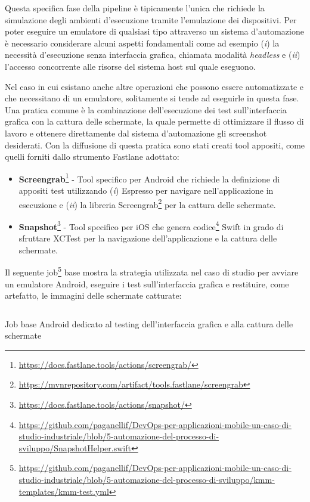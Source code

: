 Questa specifica fase della pipeline è tipicamente l'unica che richiede la simulazione degli ambienti d'esecuzione tramite l'emulazione dei dispositivi. 
Per poter eseguire un emulatore di qualsiasi tipo attraverso un sistema d'automazione è necessario considerare alcuni aspetti fondamentali come ad esempio (\textit{i}) la necessità d'esecuzione senza interfaccia grafica, 
chiamata modalità \textit{headless} e (\textit{ii}) l'accesso concorrente alle risorse del sistema host sul quale eseguono. 

Nel caso in cui esistano anche altre operazioni che possono essere automatizzate e che necessitano di un emulatore,
solitamente si tende ad eseguirle in questa fase. 
Una pratica comune è la combinazione dell'esecuzione dei test sull'interfaccia grafica con la cattura delle schermate, 
la quale permette di ottimizzare il flusso di lavoro e ottenere direttamente dal sistema d'automazione gli screenshot desiderati. 
Con la diffusione di questa pratica sono stati creati tool appositi, come quelli forniti dallo strumento Fastlane adottato:

\begin{itemize}
    \item \textbf{Screengrab}\footnote{\href{https://docs.fastlane.tools/actions/screengrab/}{https://docs.fastlane.tools/actions/screengrab/}} - Tool specifico per Android che richiede la definizione di appositi test utilizzando (\textit{i}) Espresso per navigare nell'applicazione in esecuzione e (\textit{ii}) la libreria Screengrab\footnote{\href{https://mvnrepository.com/artifact/tools.fastlane/screengrab}{https://mvnrepository.com/artifact/tools.fastlane/screengrab}} per la cattura delle schermate.
    
    \item \textbf{Snapshot}\footnote{\href{https://docs.fastlane.tools/actions/snapshot/}{https://docs.fastlane.tools/actions/snapshot/}} - Tool specifico per iOS che genera codice\footnote{\href{https://github.com/paganellif/DevOps-per-applicazioni-mobile-un-caso-di-studio-industriale/blob/5-automazione-del-processo-di-sviluppo/SnapshotHelper.swift}{https://github.com/paganellif/DevOps-per-applicazioni-mobile-un-caso-di-studio-industriale/blob/5-automazione-del-processo-di-sviluppo/SnapshotHelper.swift}} Swift in grado di sfruttare XCTest per la navigazione dell'applicazione e la cattura delle schermate.
\end{itemize}

Il seguente job\footnote{\href{https://github.com/paganellif/DevOps-per-applicazioni-mobile-un-caso-di-studio-industriale/blob/5-automazione-del-processo-di-sviluppo/kmm-templates/kmm-test.yml}{https://github.com/paganellif/DevOps-per-applicazioni-mobile-un-caso-di-studio-industriale/blob/5-automazione-del-processo-di-sviluppo/kmm-templates/kmm-test.yml}} base mostra la strategia utilizzata nel caso di studio per avviare un emulatore Android, 
eseguire i test sull'interfaccia grafica e restituire, 
come artefatto, 
le immagini delle schermate catturate:
\begin{listing}[H]
    \inputminted{yaml}{code/base-ui-test-android.yaml}
    \caption{Job base Android dedicato al testing dell'interfaccia grafica e alla cattura delle schermate}
\end{listing}

